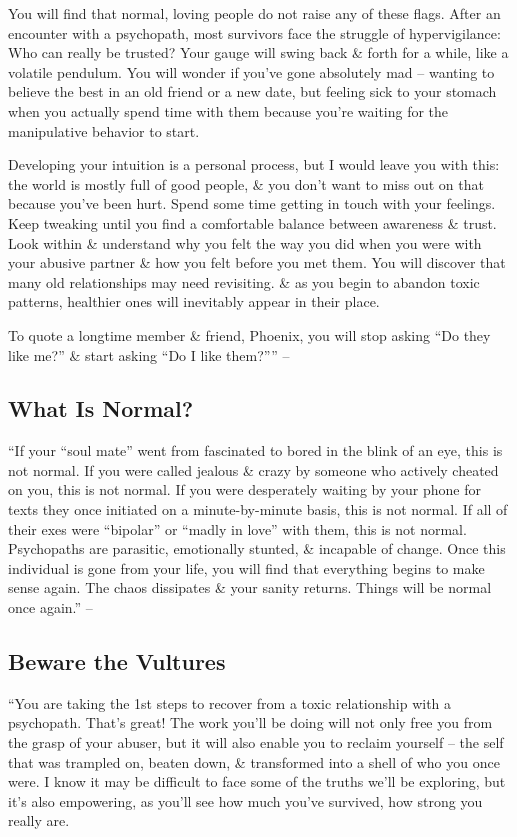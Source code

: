 \documentclass{article}
\numberwithin{equation}{section}
\begin{document}
You will find that normal, loving people do not raise any of these flags. After an encounter with a psychopath, most survivors face the struggle of hypervigilance: Who can really be trusted? Your gauge will swing back \& forth for a while, like a volatile pendulum. You will wonder if you've gone absolutely mad -- wanting to believe the best in an old friend or a new date, but feeling sick to your stomach when you actually spend time with them because you're waiting for the manipulative behavior to start.

Developing your intuition is a personal process, but I would leave you with this: the world is mostly full of good people, \& you don't want to miss out on that because you've been hurt. Spend some time getting in touch with your feelings. Keep tweaking until you find a comfortable balance between awareness \& trust. Look within \& understand why you felt the way you did when you were with your abusive partner \& how you felt before you met them. You will discover that many old relationships may need revisiting. \& as you begin to abandon toxic patterns, healthier ones will inevitably appear in their place.

To quote a longtime member \& friend, Phoenix, you will stop asking ``Do they like me?'' \& start asking ``Do I like them?'''' -- \cite[pp. 10--17]{MacKenzie2015}

\subsection{What Is Normal?}
``If your ``soul mate'' went from fascinated to bored in the blink of an eye, this is not normal. If you were called jealous \& crazy by someone who actively cheated on you, this is not normal. If you were desperately waiting by your phone for texts they once initiated on a minute-by-minute basis, this is not normal. If all of their exes were ``bipolar'' or ``madly in love'' with them, this is not normal. Psychopaths are parasitic, emotionally stunted, \& incapable of change. Once this individual is gone from your life, you will find that everything begins to make sense again. The chaos dissipates \& your sanity returns. Things will be normal once again.'' -- \cite[p. 17]{MacKenzie2015}

\subsection{Beware the Vultures}
``You are taking the 1st steps to recover from a toxic relationship with a psychopath. That's great! The work you'll be doing will not only free you from the grasp of your abuser, but it will also enable you to reclaim yourself -- the self that was trampled on, beaten down, \& transformed into a shell of who you once were. I know it may be difficult to face some of the truths we'll be exploring, but it's also empowering, as you'll see how much you've survived, how strong you really are.
\end{document}
